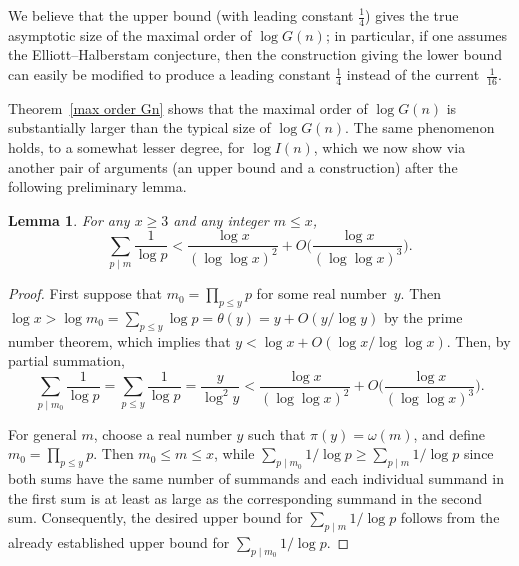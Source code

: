 \documentclass[12pt,reqno]{amsart}
\newtheorem{lemma}[theorem]{Lemma}
\theoremstyle{definition}
\begin{document}
We believe that the upper bound (with leading constant $\frac14$) gives the true asymptotic size of the maximal order of $\log G(n)$; in particular, if one assumes the Elliott--Halberstam conjecture, then the construction giving the lower bound can easily be modified to produce a leading constant $\frac14$ instead of the current~$\frac1{16}$.

Theorem~\ref{max order Gn} shows that the maximal order of $\log G(n)$ is substantially larger than the typical size of $\log G(n)$. The same phenomenon holds, to a somewhat lesser degree, for $\log I(n)$, which we now show via another pair of arguments (an upper bound and a construction) after the following preliminary lemma.

\begin{lemma}  \label{log recip phi sum}
For any $x\ge3$ and any integer $m\le x$,
\[
\sum_{p \mid m} \frac{1}{\log p} < \frac{\log x}{(\log\log x)^2} + O\bigg( \frac{\log x}{(\log\log x)^3} \bigg).
\]
\end{lemma}

\begin{proof}
First suppose that $m_0 = \prod_{p\le y} p$ for some real number~$y$. Then $\log x > \log m_0 = \sum_{p\le y} \log p = \theta(y) = y + O(y/\log y)$ by the prime number theorem, which implies that $y < \log x + O(\log x/\log\log x)$. Then, by partial summation,
\[
\sum_{p \mid m_0} \frac{1}{\log p} = \sum_{p \le y} \frac{1}{\log p} = \frac{y}{\log^2 y} < \frac{\log x}{(\log\log x)^2} + O\bigg( \frac{\log x}{(\log\log x)^3} \bigg).
\]

For general $m$, choose a real number $y$ such that $\pi(y) = \omega(m)$, and define $m_0 = \prod_{p\le y} p$. Then $m_0 \le m \le x$, while $\sum_{p \mid m_0} 1/\log p \ge \sum_{p \mid m} 1/\log p$ since both sums have the same number of summands and each individual summand in the first sum is at least as large as the corresponding summand in the second sum. Consequently, the desired upper bound for $\sum_{p \mid m} 1/\log p$ follows from the already established upper bound for $\sum_{p \mid m_0} 1/\log p$.
\end{proof}
\end{document}
